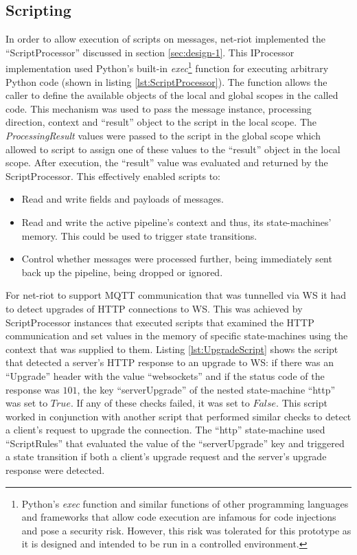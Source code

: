 \subsection{Scripting}
In order to allow execution of scripts on messages, net-riot implemented the \enquote{ScriptProcessor} discussed in section \ref{sec:design-1}. This IProcessor implementation used Python's built-in \emph{exec}\footnote{Python's \emph{exec} function and similar functions of other programming languages and frameworks that allow code execution are infamous for code injections and pose a security risk. However, this risk was tolerated for this prototype as it is designed and intended to be run in a controlled environment. } function for executing arbitrary Python code (shown in listing \ref{lst:ScriptProcessor}). The function allows the caller to define the available objects of the local and global scopes in the called code. This mechanism was used to pass the message instance, processing direction, context and \enquote{result} object to the script in the local scope. The \emph{ProcessingResult} values were passed to the script in the global scope which allowed to script to assign one of these values to the \enquote{result} object in the local scope. After execution, the \enquote{result} value was evaluated and returned by the ScriptProcessor. This effectively enabled scripts to:
\begin{itemize}
    \item Read and write fields and payloads of messages.
    \item Read and write the active pipeline's context and thus, its state-machines' memory. This could be used to trigger state transitions.
    \item Control whether messages were processed further, being immediately sent back up the pipeline, being dropped or ignored.
\end{itemize}

For net-riot to support \ac{MQTT} communication that was tunnelled via \ac{WS} it had to detect upgrades of \ac{HTTP} connections to \ac{WS}. This was achieved by ScriptProcessor instances that executed scripts that examined the \ac{HTTP} communication and set values in the memory of specific state-machines using the context that was supplied to them. Listing \ref{lst:UpgradeScript} shows the script that detected a server's \ac{HTTP} response to an upgrade to \ac{WS}: if there was an \enquote{Upgrade} header with the value \enquote{websockets} and if the status code of the response was $101$, the key \enquote{serverUpgrade} of the nested state-machine \enquote{http} was set to $True$. If any of these checks failed, it was set to $False$. This script worked in conjunction with another script that performed similar checks to detect a client's request to upgrade the connection. The \enquote{http} state-machine used \enquote{ScriptRules} that evaluated the value of the \enquote{serverUpgrade} key and triggered a state transition if both a client's upgrade request and the server's upgrade response were detected.
